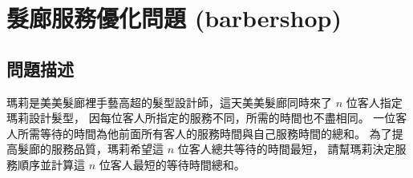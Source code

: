 \section{髮廊服務優化問題 (barbershop)}

\subsection{問題描述}

瑪莉是美美髮廊裡手藝高超的髮型設計師，這天美美髮廊同時來了
\begin{math}n\end{math} 位客人指定瑪莉設計髮型，
因每位客人所指定的服務不同，所需的時間也不盡相同。
一位客人所需等待的時間為他前面所有客人的服務時間與自己服務時間的總和。
為了提高髮廊的服務品質，瑪莉希望這 \begin{math}n\end{math}
位客人總共等待的時間最短， 請幫瑪莉決定服務順序並計算這
\begin{math}n\end{math} 位客人最短的等待時間總和。

